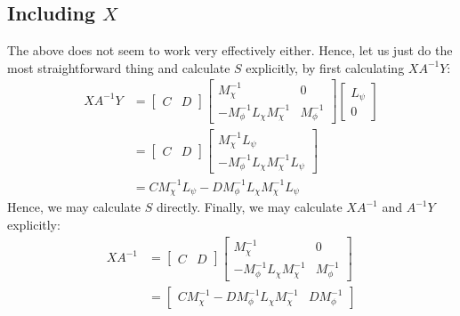 \documentclass[reqno]{article}
\begin{document}
\subsection{Including $X$}
The above does not seem to work very effectively either. 
Hence, let us just do the most straightforward thing and calculate $S$ explicitly, by first calculating $X A^{-1} Y$:
\begin{equation}
    \begin{split}
        X A^{-1} Y
        &=
        \begin{bmatrix}
            C &D
        \end{bmatrix}
        \begin{bmatrix}
            M_\chi^{-1} &0 \\
            -M_\phi^{-1} L_\chi M_\chi^{-1} &M_\phi^{-1}
        \end{bmatrix}
        \begin{bmatrix}
            L_\psi \\
            0
        \end{bmatrix}\\
        &=
        \begin{bmatrix}
            C &D
        \end{bmatrix}
        \begin{bmatrix}
            M_\chi^{-1} L_\psi \\
            -M_\phi^{-1} L_\chi M_\chi^{-1} L_\psi
        \end{bmatrix} \\
        &=
        C M_\chi^{-1} L_\psi
        - D M_\phi^{-1} L_\chi M_\chi^{-1} L_\psi
    \end{split}
\end{equation}
Hence, we may calculate $S$ directly.
Finally, we may calculate $X A^{-1}$ and $A^{-1} Y$ explicitly:
\begin{equation}
    \begin{split}
        X A^{-1}
        &=
        \begin{bmatrix}
            C &D
        \end{bmatrix}
        \begin{bmatrix}
            M_\chi^{-1} &0 \\
            - M_\phi^{-1} L_\chi M_\chi^{-1} &M_\phi^{-1}
        \end{bmatrix} \\
        &= 
        \begin{bmatrix}
            C M_\chi^{-1} - D M_\phi^{-1} L_\chi M_\chi^{-1} &D M_\phi^{-1}
        \end{bmatrix}
    \end{split}
\end{equation}
\end{document}
